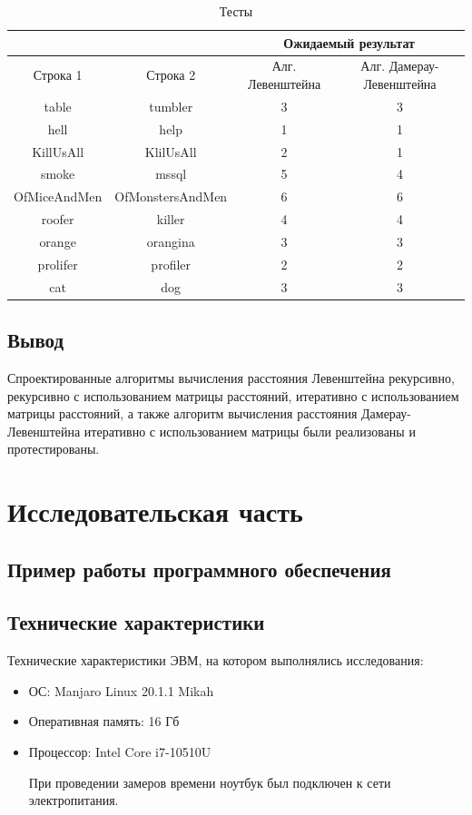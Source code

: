 \documentclass[12pt]{report}
\begin{document}
\newpage
\begin{table}[h]
	\begin{center}
		\caption{\label{table} Тесты}
		\begin{tabular}{|c|c|c|c|}
	\hline
			                    &                    & \multicolumn{2}{c|}{\bfseries Ожидаемый результат}    \\ \cline{3-4}\hline
	Строка 1& Строка 2 & Алг. Левенштейна & Алг. Дамерау-Левенштейна \\ [0.5ex] 
 	\hline\hline
 	table & tumbler & 3 & 3\\
 	\hline
 	hell & help & 1 & 1\\
 	\hline
	KillUsAll & KlilUsAll & 2 & 1\\
	\hline
	smoke & mssql & 5 & 4\\
	\hline
	OfMiceAndMen & OfMonstersAndMen & 6 & 6\\
	\hline
	roofer & killer & 4 & 4\\
	\hline
	orange & orangina & 3 & 3\\
	\hline
	prolifer & profiler & 2 & 2\\
	\hline
	cat & dog & 3 & 3\\
	\hline
		\end{tabular}
	\end{center}
\end{table}

\section*{Вывод}
Спроектированные алгоритмы вычисления расстояния Левенштейна рекурсивно, рекурсивно с использованием матрицы расстояний, итеративно с использованием матрицы расстояний, а также алгоритм вычисления расстояния Дамерау-Левенштейна итеративно с использованием матрицы были реализованы и протестированы.

\chapter{Исследовательская часть}

\section{Пример работы программного обеспечения}


\section{Технические характеристики}
Технические характеристики ЭВМ, на котором выполнялись исследования:
\begin{itemize}
\item ОС: Manjaro Linux 20.1.1 Mikah
\item Оперативная память: 16 Гб
\item Процессор: Intel Core i7-10510U

При проведении замеров времени ноутбук был подключен к сети электропитания.
\end{itemize}
\end{document}
